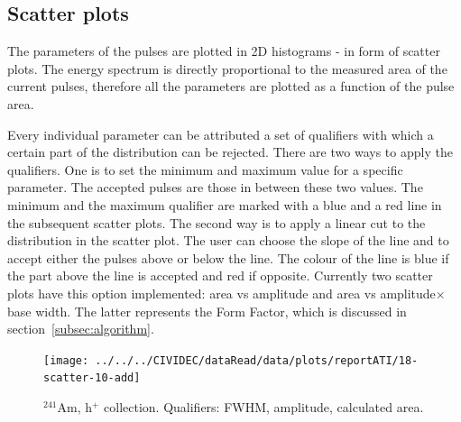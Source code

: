 \subsection{Scatter plots}
The parameters of the pulses are plotted in 2D histograms - in form of scatter plots. The energy spectrum is directly proportional to the measured area of the current pulses, therefore all the parameters are plotted as a function of the pulse area.

Every individual parameter can be attributed a set of qualifiers with which a certain part of the distribution can be rejected. There are two ways to apply the qualifiers. One is to set the minimum and maximum value for a specific parameter. The accepted pulses are those in between these two values. The minimum and the maximum qualifier are marked with a blue and a red line in the subsequent scatter plots. The second way is to apply a linear cut to the distribution in the scatter plot. The user can choose the slope of the line and to accept either the pulses above or below the line. The colour of the line is blue if the part above the line is accepted and red if opposite. Currently two scatter plots have this option implemented: area vs amplitude and area vs amplitude$\times$base width. The latter represents the Form Factor, which is discussed in section~\ref{subsec:algorithm}.



 

\clearpage
\begin{figure}[!t]
\centering
\texttt{[image: ../../../CIVIDEC/dataRead/data/plots/reportATI/18-scatter-10-add]}
\caption{$^{241}$Am, h$^{+}$ collection. Qualifiers: FWHM, amplitude, calculated area.}
\label{fig:scatterah}
\end{figure}

